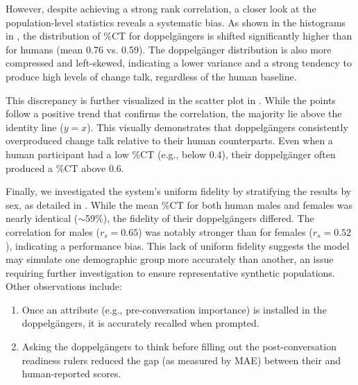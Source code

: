 However, despite achieving a strong rank correlation, a closer look at the
population-level statistics reveals a systematic bias. As shown in the histograms in
, the distribution of \%CT for doppelgängers is shifted
significantly higher than for humans (mean 0.76 vs. 0.59). The doppelgänger
distribution is also more compressed and left-skewed, indicating a lower variance and a
strong tendency to produce high levels of change talk, regardless of the human
baseline.

This discrepancy is further visualized in the scatter plot in
. While the points follow a positive trend that confirms
the correlation, the majority lie above the identity line ($y=x$). This visually
demonstrates that doppelgängers consistently overproduced change talk relative to their
human counterparts. Even when a human participant had a low \%CT (e.g., below 0.4),
their doppelgänger often produced a \%CT above 0.6.

Finally, we investigated the system's uniform fidelity by stratifying the results by
sex, as detailed in . While the mean \%CT for both
human males and females was nearly identical ($\sim$59\%), the fidelity of their
doppelgängers differed. The correlation for males ($r_s = 0.65$) was notably stronger
than for females ($r_s = 0.52$), indicating a performance bias. This lack of uniform
fidelity suggests the model may simulate one demographic group more accurately than
another, an issue requiring further investigation to ensure representative synthetic
populations. Other observations include:

\begin{enumerate}
	\item Once an attribute (e.g., pre-conversation importance) is installed in the
	      doppelgängers, it is accurately recalled when prompted.
	\item Asking the doppelgängers to think before filling out the post-conversation readiness
	      rulers reduced the gap (as measured by MAE) between their and human-reported scores.
\end{enumerate}


